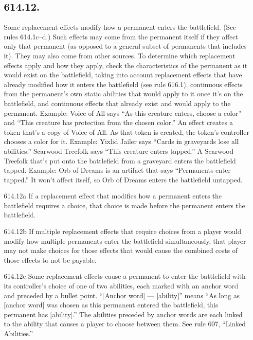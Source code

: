 \subsection*{614.12.}
Some replacement effects modify how a permanent enters the battlefield. (See rules 614.1c–d.) Such effects may come from the permanent itself if they affect only that permanent (as opposed to a general subset of permanents that includes it). They may also come from other sources. To determine which replacement effects apply and how they apply, check the characteristics of the permanent as it would exist on the battlefield, taking into account replacement effects that have already modified how it enters the battlefield (see rule 616.1), continuous effects from the permanent’s own static abilities that would apply to it once it’s on the battlefield, and continuous effects that already exist and would apply to the permanent.
Example: Voice of All says “As this creature enters, choose a color” and “This creature has protection from the chosen color.” An effect creates a token that’s a copy of Voice of All. As that token is created, the token’s controller chooses a color for it.
Example: Yixlid Jailer says “Cards in graveyards lose all abilities.” Scarwood Treefolk says “This creature enters tapped.” A Scarwood Treefolk that’s put onto the battlefield from a graveyard enters the battlefield tapped.
Example: Orb of Dreams is an artifact that says “Permanents enter tapped.” It won’t affect itself, so Orb of Dreams enters the battlefield untapped.

614.12a If a replacement effect that modifies how a permanent enters the battlefield requires a choice, that choice is made before the permanent enters the battlefield.

614.12b If multiple replacement effects that require choices from a player would modify how multiple permanents enter the battlefield simultaneously, that player may not make choices for those effects that would cause the combined costs of those effects to not be payable.

614.12c Some replacement effects cause a permanent to enter the battlefield with its controller’s choice of one of two abilities, each marked with an anchor word and preceded by a bullet point. “[Anchor word] — [ability]” means “As long as [anchor word] was chosen as this permanent entered the battlefield, this permanent has [ability].” The abilities preceded by anchor words are each linked to the ability that causes a player to choose between them. See rule 607, “Linked Abilities.”

